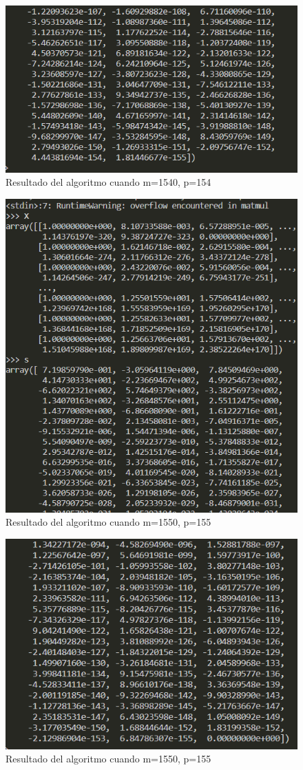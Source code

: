 \documentclass[letterpaper]{article}
\newcommand{\1}{\mathds{1}}
\theoremstyle{definition}
\theoremstyle{definition}
\theoremstyle{definition}
\theoremstyle{definition}
\theoremstyle{definition}
\begin{document}
\begin{enumerate}
\begin{enumerate}
            \begin{figure}[h]
                \centering
                \includegraphics[width=0.5\linewidth]{m15402.png}
                \caption{Resultado del algoritmo cuando m=1540, p=154}
            \end{figure}       

            \begin{figure}[h]
                \centering
                \includegraphics[width=0.5\linewidth]{m1550.png}
                \caption{Resultado del algoritmo cuando m=1550, p=155}
            \end{figure}

            \begin{figure}[h]
                \centering
                \includegraphics[width=0.5\linewidth]{m15502.png}
                \caption{Resultado del algoritmo cuando m=1550, p=155}
            \end{figure}

\end{enumerate}
\end{enumerate}
\end{document}
